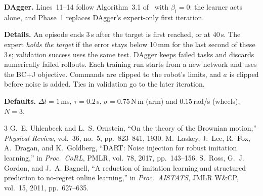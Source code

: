 \documentclass[10pt]{article}
\begin{document}
\noindent\textbf{DAgger.}
Lines~11--14 follow Algorithm~3.1 of~\cite{dagger} with $\beta_i=0$: the learner acts alone,
and Phase~1 replaces DAgger's expert-only first iteration.

\medskip
\noindent\textbf{Details.}
An episode ends 3\,s after the target is first reached, or at 40\,s. The expert \emph{holds the
target} if the error stays below 10\,mm for the last second of these 3\,s; validation success uses
the same test. DAgger keeps failed tasks and discards numerically failed rollouts. Each training
run starts from a new network and uses the BC+J objective. Commands are clipped to the robot's limits,
and $a$ is clipped before noise is added. Ties in validation go to the later iteration.

\medskip
\noindent\textbf{Defaults.}
$\Delta t=1$\,ms, $\tau=0.2$\,s, $\sigma=0.75$\,N\,m (arm) and $0.15$\,rad/s (wheels), $N=3$.

\medskip
\begin{thebibliography}{3}
\footnotesize
\setlength{\itemsep}{0pt}
G.~E. Uhlenbeck and L.~S. Ornstein, ``On the theory of the Brownian motion,''
\emph{Physical Review}, vol.~36, no.~5, pp.~823--841, 1930.
M.~Laskey, J.~Lee, R.~Fox, A.~Dragan, and K.~Goldberg, ``DART: Noise injection for robust
imitation learning,'' in \emph{Proc.\ CoRL}, PMLR, vol.~78, 2017, pp.~143--156.
S.~Ross, G.~J. Gordon, and J.~A. Bagnell, ``A reduction of imitation learning and structured
prediction to no-regret online learning,'' in \emph{Proc.\ AISTATS}, JMLR W\&CP, vol.~15, 2011, pp.~627--635.
\end{thebibliography}
\end{document}
